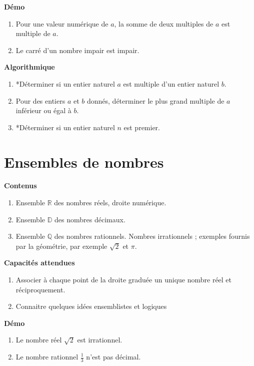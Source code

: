\documentclass[10pt,a4paper]{article}
\begin{document}
\textbf{Démo}

\begin{enumerate}
\item  Pour une valeur numérique de $a$, la somme de deux multiples de $a$ est multiple de $a$.
\item  Le carré d'un nombre impair est impair.
\end{enumerate}

\textbf{Algorithmique}

\begin{enumerate}
\item *Déterminer si un entier naturel $a$ est multiple d'un entier naturel $b$.
\item Pour des entiers $a$ et $b$ donnés, déterminer le plus grand multiple de $a$ inférieur ou égal à $b$.
\item *Déterminer si un entier naturel $n$ est premier.
 \end{enumerate}


\section{Ensembles de nombres}

\textbf{Contenus}

\begin{enumerate}
\item Ensemble $\mathbb{R}$ des nombres réels, droite numérique.
\item Ensemble $\mathbb{D}$ des nombres décimaux. 
\item Ensemble $\mathbb{Q}$ des nombres rationnels. Nombres irrationnels ; exemples fournis par la géométrie, par exemple $\sqrt 2$ et $\pi$.
\end{enumerate}

\textbf{Capacités attendues}

\begin{enumerate}
\item Associer à chaque point de la droite graduée un unique nombre réel et réciproquement.
\item Connaitre quelques idées ensemblistes et logiques
\end{enumerate}


\textbf{Démo}

\begin{enumerate}
\item   Le nombre réel $\sqrt 2 $ est irrationnel.
\item   Le nombre rationnel $\frac13$ n'est pas décimal.
\end{enumerate}
\end{document}
